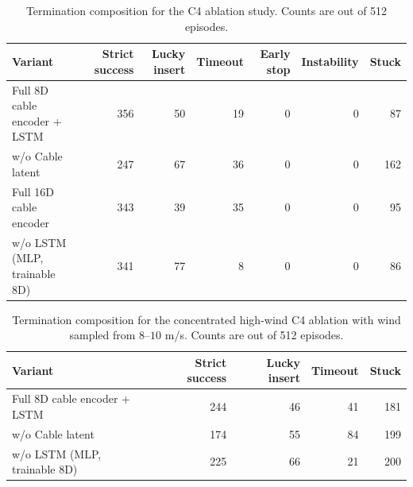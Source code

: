 \begin{table}[t]
  \centering
  \caption{Termination composition for the C4 ablation study. Counts are out of 512 episodes.}
  \label{tab:formal_interval_ablation_terminations}
  \setlength{\tabcolsep}{5pt}
  \begin{tabular}{lrrrrrr}
    \toprule
    Variant & Strict success & Lucky insert & Timeout & Early stop & Instability & Stuck \\
    \midrule
    Full 8D cable encoder + LSTM & 356 & 50 & 19 & 0 & 0 & 87 \\
    w/o Cable latent & 247 & 67 & 36 & 0 & 0 & 162 \\
    Full 16D cable encoder & 343 & 39 & 35 & 0 & 0 & 95 \\
    w/o LSTM (MLP, trainable 8D) & 341 & 77 & 8 & 0 & 0 & 86 \\
    \bottomrule
  \end{tabular}
\end{table}

\begin{table}[t]
  \centering
  \caption{Termination composition for the concentrated high-wind C4 ablation with wind sampled from $8$--$10$ m/s. Counts are out of 512 episodes.}
  \label{tab:formal_interval_ablation_wind8to10_terminations}
  \setlength{\tabcolsep}{5pt}
  \begin{tabular}{lrrrr}
    \toprule
    Variant & Strict success & Lucky insert & Timeout & Stuck \\
    \midrule
    Full 8D cable encoder + LSTM & 244 & 46 & 41 & 181 \\
    w/o Cable latent & 174 & 55 & 84 & 199 \\
    w/o LSTM (MLP, trainable 8D) & 225 & 66 & 21 & 200 \\
    \bottomrule
  \end{tabular}
\end{table}
